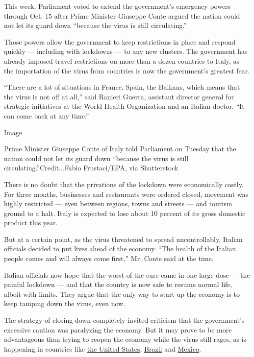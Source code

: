 This week, Parliament voted to extend the government's emergency powers
through Oct. 15 after Prime Minister Giuseppe Conte argued the nation
could not let its guard down ``because the virus is still circulating.''

Those powers allow the government to keep restrictions in place and
respond quickly --- including with lockdowns --- to any new clusters.
The government has already imposed travel restrictions on more than a
dozen countries to Italy, as the importation of the virus from countries
is now the government's greatest fear.

``There are a lot of situations in France, Spain, the Balkans, which
means that the virus is not off at all,'' said Ranieri Guerra, assistant
director general for strategic initiatives at the World Health
Organization and an Italian doctor. ``It can come back at any time.''

Image

Prime Minister Giuseppe Conte of Italy told Parliament on Tuesday that
the nation could not let its guard down ``because the virus is still
circulating.''Credit...Fabio Frustaci/EPA, via Shutterstock

There is no doubt that the privations of the lockdown were economically
costly. For three months, businesses and restaurants were ordered
closed, movement was highly restricted --- even between regions, towns
and streets --- and tourism ground to a halt. Italy is expected to lose
about 10 percent of its gross domestic product this year.

But at a certain point, as the virus threatened to spread
uncontrollably, Italian officials decided to put lives ahead of the
economy. ``The health of the Italian people comes and will always come
first,'' Mr. Conte said at the time.

Italian officials now hope that the worst of the cure came in one large
dose --- the painful lockdown --- and that the country is now safe to
resume normal life, albeit with limits. They argue that the only way to
start up the economy is to keep tamping down the virus, even now.

The strategy of closing down completely invited criticism that the
government's excessive caution was paralyzing the economy. But it may
prove to be more advantageous than trying to reopen the economy while
the virus still rages, as is happening in countries like
\href{https://www.nytimes.com/2020/03/13/us/coronavirus-deaths-estimate.html}{the
United States},
\href{https://www.nytimes.com/article/brazil-coronavirus-cases.html}{Brazil}
and
\href{https://www.nytimes.com/2020/06/05/world/americas/coronavirus-mexico-reopening.html}{Mexico}.

